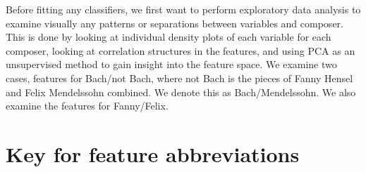 \documentclass[12pt,twoside]{reedthesis}
\theoremstyle{definition}
\theoremstyle{definition}
\theoremstyle{definition}
\theoremstyle{remark}
\begin{document}
Before fitting any classifiers, we first want to perform exploratory
data analysis to examine visually any patterns or separations between
variables and composer. This is done by looking at individual density
plots of each variable for each composer, looking at correlation
structures in the features, and using PCA as an unsupervised method to
gain insight into the feature space. We examine two cases, features for
Bach/not Bach, where not Bach is the pieces of Fanny Hensel and Felix
Mendelssohn combined. We denote this as Bach/Mendelssohn. We also
examine the features for Fanny/Felix.

\section{Key for feature
abbreviations}\label{key-for-feature-abbreviations}
\end{document}
